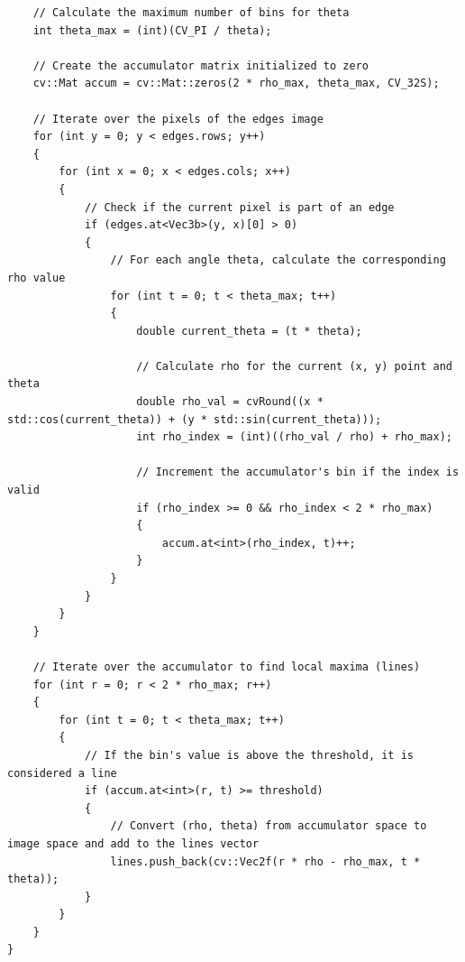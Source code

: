 \documentclass[12pt,a4paper]{report}
\begin{document}
\begin{lstlisting}
    // Calculate the maximum number of bins for theta
    int theta_max = (int)(CV_PI / theta);

    // Create the accumulator matrix initialized to zero
    cv::Mat accum = cv::Mat::zeros(2 * rho_max, theta_max, CV_32S);

    // Iterate over the pixels of the edges image
    for (int y = 0; y < edges.rows; y++)
    {
        for (int x = 0; x < edges.cols; x++)
        {
            // Check if the current pixel is part of an edge
            if (edges.at<Vec3b>(y, x)[0] > 0)
            {
                // For each angle theta, calculate the corresponding rho value
                for (int t = 0; t < theta_max; t++)
                {
                    double current_theta = (t * theta);

                    // Calculate rho for the current (x, y) point and theta
                    double rho_val = cvRound((x * std::cos(current_theta)) + (y * std::sin(current_theta)));
                    int rho_index = (int)((rho_val / rho) + rho_max);

                    // Increment the accumulator's bin if the index is valid
                    if (rho_index >= 0 && rho_index < 2 * rho_max)
                    {
                        accum.at<int>(rho_index, t)++;
                    }
                }
            }
        }
    }

    // Iterate over the accumulator to find local maxima (lines)
    for (int r = 0; r < 2 * rho_max; r++)
    {
        for (int t = 0; t < theta_max; t++)
        {
            // If the bin's value is above the threshold, it is considered a line
            if (accum.at<int>(r, t) >= threshold)
            {
                // Convert (rho, theta) from accumulator space to image space and add to the lines vector
                lines.push_back(cv::Vec2f(r * rho - rho_max, t * theta));
            }
        }
    }
}
\end{lstlisting}
\end{document}
